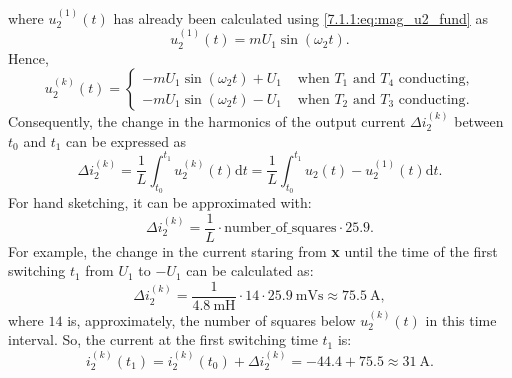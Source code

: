 \begin{solutionblock}
    where $u^{(1)}_\mathrm{2}(t)$ has already been calculated using \eqref{7.1.1:eq:mag_u2_fund} as
    \begin{equation}
        u^{(1)}_\mathrm{2}(t) = m U_{\mathrm{1}} \sin(\omega_2 t).         
    \end{equation}
    Hence,
    \begin{equation}
        u^{(k)}_\mathrm{2}(t) =  \begin{cases}
            - m U_{\mathrm{1}} \sin(\omega_2 t) + U_{\mathrm{1}} &\text{ when $T_1$ and $T_4$ conducting,}\\
            - m U_{\mathrm{1}} \sin(\omega_2 t)  - U_{\mathrm{1}} &\text{ when $T_2$ and $T_3$ conducting}.
            \end{cases}
        \label{7.1.2:eq:u_2_harm_cases}         
    \end{equation}
    Consequently, the change in the harmonics of the output current $\Delta i^{(k)}_\mathrm{2}$ between $t_0$ and $t_1$ can be expressed as 
    \begin{equation}
        \Delta i^{(k)}_\mathrm{2} = \frac{1}{L} \int_{t_0}^{t_1} u^{(k)}_\mathrm{2}(t) \mathrm{d}t = \frac{1}{L} \int_{t_0}^{t_1} u_\mathrm{2}(t) - u^{(1)}_\mathrm{2}(t) \mathrm{d}t.
        \label{7.1.2:eq:i_2_harm}         
    \end{equation}
    For hand sketching, it can be approximated with:
        \begin{equation}
            \Delta i^{(k)}_\mathrm{2} = \frac{1}{L} \cdot \text{number\_of\_squares} \cdot 25.9.
            \label{7.1.2:eq:approx_i_2_harm}         
        \end{equation}
        For example, the change in the current staring from \textbf{x} until the time of the first switching $t_1$ from $U_1$ to $-U_1$ can be calculated as:
        \begin{equation}
            \Delta i^{(k)}_\mathrm{2} = \frac{1}{\SI{4.8}{\milli \henry}} \cdot 14 \cdot \SI{25.9}{\milli \volt \second} \approx \SI{75.5}{\ampere},
            \label{7.1.2:eq:approx_i_2_harm_example}         
        \end{equation}
        where $14$ is, approximately, the number of squares below $u^{(k)}_\mathrm{2}(t)$ in this time interval. So, the current at the first switching time $t_1$ is:
        \begin{equation}
            i^{(k)}_\mathrm{2}(t_1) = i^{(k)}_\mathrm{2}(t_0) + \Delta i^{(k)}_\mathrm{2} = -44.4 + 75.5 \approx \SI{31}{\ampere}.
            \label{7.1.2:eq:approx_i_2_harm_t1}         
        \end{equation}
\end{solutionblock}
